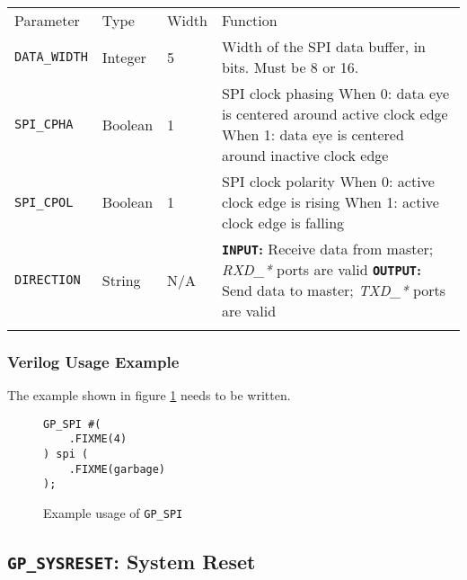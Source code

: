 \documentclass[11pt]{article}
\newcommand{\namestyle}[1]{\textit{#1}}
\newcommand{\tokenstyle}[1]{\texttt{#1}}
\newcommand{\valuestyle}[1]{\texttt{#1}}
\newcommand{\strvaluestyle}[1]{\valuestyle{\textquotedbl#1\textquotedbl}}
\newcommand{\strexamplestyle}[1]{\textbf{\strvaluestyle{#1}:}}
\newcommand{\whenstyle}[1]{{\fontseries{sb}\selectfont#1}}
\newcommand{\thinhline}{\Xhline{1\arrayrulewidth}}
\newcommand{\thickhline}{\Xhline{2.5\arrayrulewidth}}
\begin{document}
\begin{tabularx}{\textwidth}{lllX}
\thinhline
\whenstyle{Parameter} & \whenstyle{Type} & \whenstyle{Width} & \whenstyle{Function} \\
\thickhline
\tokenstyle{DATA\_WIDTH} & Integer & 5 & Width of the SPI data buffer, in bits. Must be 8 or 16. \\
\thinhline
\tokenstyle{SPI\_CPHA} & Boolean & 1 & SPI clock phasing \newline
\whenstyle{When 0:} data eye is centered around active clock edge \newline
\whenstyle{When 1:} data eye is centered around inactive clock edge\\
\thinhline
\tokenstyle{SPI\_CPOL} & Boolean & 1 & SPI clock polarity \newline
\whenstyle{When 0:} active clock edge is rising \newline
\whenstyle{When 1:} active clock edge is falling   \\
\thinhline

\tokenstyle{DIRECTION} & String & N/A &
\strexamplestyle{INPUT} Receive data from master; \namestyle{RXD\_*} ports are valid \newline
\strexamplestyle{OUTPUT} Send data to master; \namestyle{TXD\_*} ports are valid \newline \\
\thinhline
\end{tabularx}

\subsubsection{Verilog Usage Example}

The example shown in figure \ref{gp-spi-example} needs to be written.

\begin{figure}[h]
\begin{lstlisting}
GP_SPI #(
	.FIXME(4)
) spi (
	.FIXME(garbage)
);
\end{lstlisting}
\caption{Example usage of \tokenstyle{GP\_SPI}}
\label{gp-spi-example}
\end{figure}



\pagebreak
\clearpage
\subsection{\tokenstyle{GP\_SYSRESET}: System Reset}
\label{gp-sysreset}
\end{document}
